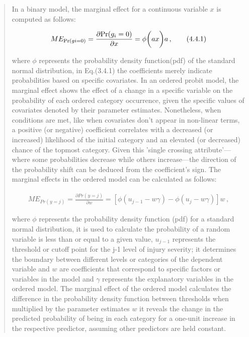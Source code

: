 \documentclass[12]{report}
\begin{document}
\begin{quote}
{In a binary model, the marginal effect for a continuous variable $x$ is computed as follows:

\begin{fleqn}
\begin{align*}
ME_{\text{Pr}(gi = 0)} = \frac{\partial \text{Pr}(g_i = 0)}{\partial x} = \phi \biggl( \scalebox{1}{$ax$} \biggr) \scalebox{1}{$a$} \, ,
\tag{4.4.1}
\end{align*}
\end{fleqn}

where $\phi$ represents the probability density function(pdf) of the standard normal distribution, in  Eq.(3.4.1) the coefficients merely indicate probabilities based on specific covariates. In an ordered probit model, the marginal effect shows the effect of a change in a specific variable on the probability of each ordered category occurrence, given the specific values of covariates denoted by their parameter estimates.  Nonetheless, when conditions are met, like when covariates don't appear in non-linear terms, a positive (or negative) coefficient correlates with a decreased (or increased) likelihood of the initial category and an elevated (or decreased) chance of the topmost category. Given this 'single crossing attribute'—where some probabilities decrease while others increase—the direction of the probability shift can be deduced from the coefficient's sign. The marginal effects in the ordered model can be calculated as follows:

\begin{fleqn}
\begin{align*}
ME_{Pr(y = j)} = \frac{\partial Pr(y = j)}{\partial w} = \left[ \phi(u_{j-1} - w \gamma) - \phi(u_{j} - w \gamma) \right]w  \, ,
\tag{4.4.2}
\end{align*}
\end{fleqn}

where $\phi$ represents the probability density  function (pdf) for a standard normal distribution, it is used to calculate the probability of a random variable is less than or equal to a given value, $u_{j-1}$ represents the threshold or cutoff point for the j-1 level of injury severity; it determines the boundary between different levels or categories of the dependent variable and $w$ are coefficients that correspond to specific factors or variables in the model and $\gamma$ represents the explanatory variables in the ordered model. The marginal effect of the ordered model calculates the difference in the probability density function between thresholds when multiplied by the parameter estimates $w$ it reveals the change in the predicted probability of being in each category for a one-unit increase in the respective predictor, assuming other predictors are held constant.
\vspace{0.3cm}


}
\end{quote}
\end{document}
